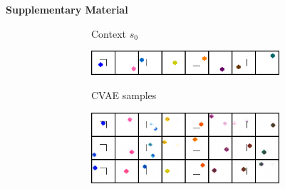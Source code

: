 \documentclass{article}
\begin{document}

{ \small


}

\pagebreak

\noindent\makebox[\linewidth]{\rule{\linewidth}{3.0pt}}
\begin{center}
\LARGE{\textbf{Supplementary Material}}
\end{center}
\noindent\makebox[\linewidth]{\rule{\linewidth}{0.8pt}}

\begin{figure}[b]
    \centering
    \vspace{-0.5cm}
    \begin{subfigure}[b]{0.49\textwidth}
        \begin{subfigure}[b]{0.4\textwidth}
            \center
            Context $s_0$ \vspace{0.2cm}
        \end{subfigure}
        \begin{subfigure}[b]{0.59\textwidth}
             {
                \includegraphics[width=1.7\linewidth]{img/cvae_samples/wall_pointmass1_x0.png}
            }
        \end{subfigure}

        \vspace{0.1cm}

        \begin{subfigure}[b]{0.4\textwidth}
            \center
            CVAE samples \vspace{1cm}
        \end{subfigure}
        \begin{subfigure}[b]{0.59\textwidth}
             {
                \includegraphics[width=1.7\linewidth]{img/cvae_samples/wall_pointmass1_cvae_samples.png}
            }
        \end{subfigure}


\end{subfigure}
\end{figure}
\end{document}
